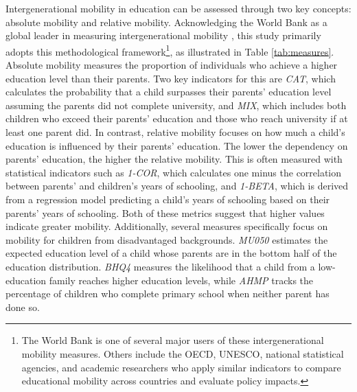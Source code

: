 Intergenerational mobility in education can be assessed through two key concepts: absolute mobility and relative mobility. Acknowledging the World Bank as a global leader in measuring intergenerational mobility \citep{van2024intergenerational, narayan2018fair}, this study primarily adopts this methodological framework\footnote{The World Bank is one of several major users of these intergenerational mobility measures. Others include the OECD, UNESCO, national statistical agencies, and academic researchers who apply similar indicators \citep{causa2010intergenerational,leone2019intergenerational, azomahou2021intergenerational, checchi2003mobility} to compare educational mobility across countries and evaluate policy impacts.}, as illustrated in Table \ref{tab:measures}. Absolute mobility measures the proportion of individuals who achieve a higher education level than their parents. Two key indicators for this are \textit{CAT}, which calculates the probability that a child surpasses their parents' education level assuming the parents did not complete university, and \textit{MIX}, which includes both children who exceed their parents' education and those who reach university if at least one parent did. In contrast, relative mobility focuses on how much a child's education is influenced by their parents' education. The lower the dependency on parents' education, the higher the relative mobility. This is often measured with statistical indicators such as \textit{1-COR}, which calculates one minus the correlation between parents' and children's years of schooling, and \textit{1-BETA}, which is derived from a regression model predicting a child's years of schooling based on their parents' years of schooling. Both of these metrics suggest that higher values indicate greater mobility. Additionally, several measures specifically focus on mobility for children from disadvantaged backgrounds. \textit{MU050} estimates the expected education level of a child whose parents are in the bottom half of the education distribution. \textit{BHQ4} measures the likelihood that a child from a low-education family reaches higher education levels, while \textit{AHMP} tracks the percentage of children who complete primary school when neither parent has done so.




